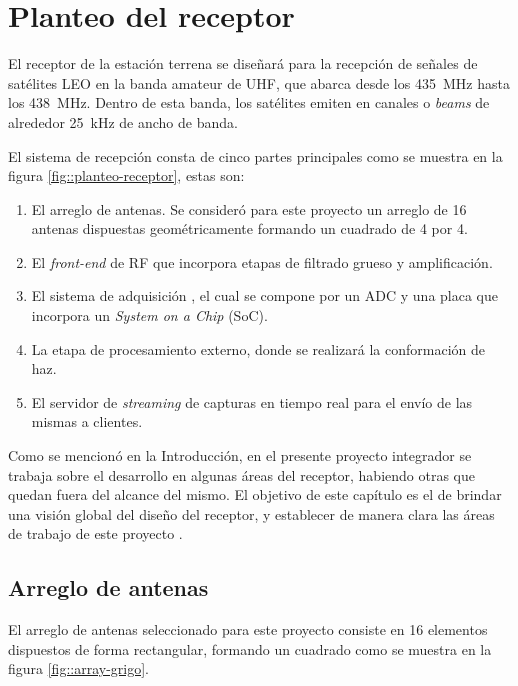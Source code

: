 \documentclass[../../main.tex]{subfiles}
\begin{document}
\graphicspath{{./figures}}
\chapter{Planteo del receptor}
El receptor de la estación terrena se diseñará para la recepción de señales de satélites LEO en la banda amateur de UHF, que abarca desde los 435~MHz hasta los 438~MHz. Dentro de esta banda, los satélites emiten en canales o \textit{beams} de alrededor 25~kHz de ancho de banda. 

El sistema de recepción consta de cinco partes principales como se muestra en la figura \ref{fig::planteo-receptor}, estas son:

\begin{enumerate}
    \item El arreglo de antenas. Se consideró para este proyecto un arreglo de 16 antenas dispuestas geométricamente formando un cuadrado de 4 por 4.
    \item El \textit{front-end} de RF que incorpora etapas de filtrado grueso y amplificación.
    \item El sistema de adquisición , el cual se compone por un ADC y una placa que incorpora un \textit{System on a Chip} (SoC).
    \item La etapa de procesamiento externo, donde se realizará la conformación de haz.
    \item El servidor de \textit{streaming} de capturas en tiempo real para el envío de las mismas a clientes.
\end{enumerate} 

Como se mencionó en la Introducción, en el presente proyecto integrador se trabaja sobre el desarrollo en algunas áreas del receptor, habiendo otras que quedan fuera del alcance del mismo. El objetivo de este capítulo es el de brindar una visión global del diseño del receptor, y establecer de manera clara las áreas de trabajo de este proyecto .


\section{Arreglo de antenas}
El arreglo de antenas seleccionado para este proyecto consiste en 16 elementos dispuestos de forma rectangular, formando un cuadrado como se muestra en la figura \ref{fig::array-grigo}.
\end{document}
